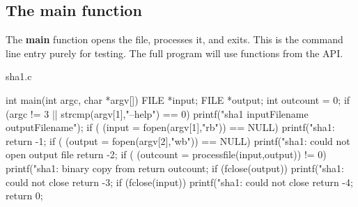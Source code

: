 \subsection{The main function}
\noindent
The {\bf main} function opens the file, processes it, and exits.
This is the command line entry purely for testing. The full program
will use functions from the API.
\begin{chunk}{sha1.c}


int main(int argc, char *argv[]) {
  FILE *input;
  FILE *output;
  int outcount = 0;
  if (argc != 3 || strcmp(argv[1],"--help") == 0) {
    printf("sha1 inputFilename outputFilename");
  }
  if ( (input = fopen(argv[1],"rb")) == NULL) {
    printf("sha1: %
    return -1;
  }
  if ( (output = fopen(argv[2],"wb")) == NULL) {
    printf("sha1: could not open output file %
    return -2;
  }
  if ( (outcount = processfile(input,output)) != 0) {
    printf("sha1: binary copy from %
    return outcount;
  }
  if (fclose(output)) {
    printf("sha1: could not close %
    return -3;
  }
  if (fclose(input)) {
    printf("sha1: could not close %
    return -4;
  }
  return 0;
}

\end{chunk}


